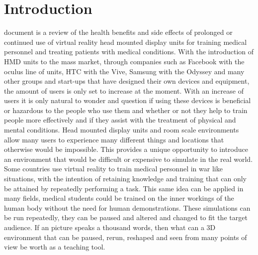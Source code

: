 \documentclass[10pt,journal,compsoc]{IEEEtran}
\begin{document}
	\section{Introduction}
	 document is a review of the health benefits and side effects of prolonged or continued use of virtual reality head mounted display units for training medical personnel and treating patients with medical conditions. With the introduction of HMD units to the mass market, through companies such as Facebook with the oculus line of units, HTC with the Vive, Samsung with the Odyssey and many other groups and start-ups that have designed their own devices and equipment, the amount of users is only set to increase at the moment. With an increase of users it is only natural to wonder and question if using these devices is beneficial or hazardous to the people who use them and whether or not they help to train people more effectively and if they assist with the treatment of physical and mental conditions. \newline \newline
	Head mounted display units and room scale environments allow many users to experience many different things and locations that otherwise would be impossible. This provides a unique opportunity to introduce an environment that would be difficult or expensive to simulate in the real world. Some countries use virtual reality to train medical personnel in war like situations, with the intention of retaining knowledge and training that can only be attained by repeatedly performing a task. This same idea can be applied in many fields,  medical students could be trained on the inner workings of the human body without the need for human demonstrations. These simulations can be run repeatedly, they can be paused and altered and changed to fit the target audience. If an picture speaks a thousand words, then what can a 3D environment that can be paused, rerun, reshaped and seen from many points of view be worth as a teaching tool.
	\newline
		
\end{document}
